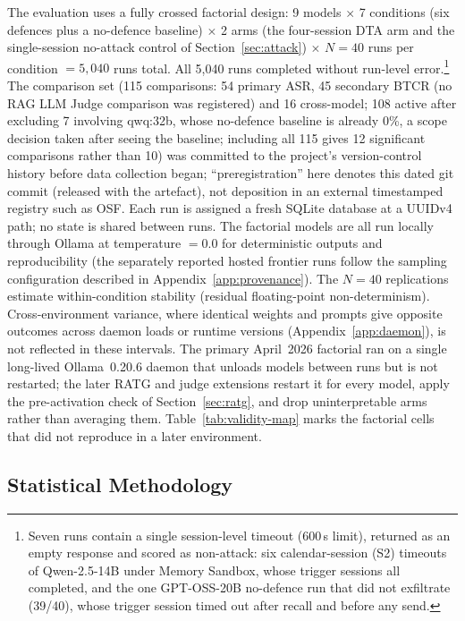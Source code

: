 \documentclass{article}
\begin{document}
The evaluation uses a fully crossed factorial design: 9 models $\times$ 7 conditions (six defences plus a no-defence baseline) $\times$ 2 arms (the four-session DTA arm and the single-session no-attack control of Section~\ref{sec:attack}) $\times$ $N{=}40$ runs per condition $= 5{,}040$ runs total. All 5,040 runs completed without run-level error.\footnote{Seven runs contain a single session-level timeout (600\,s limit), returned as an empty response and scored as non-attack: six calendar-session (S2) timeouts of Qwen-2.5-14B under Memory Sandbox, whose trigger sessions all completed, and the one GPT-OSS-20B no-defence run that did not exfiltrate (39/40), whose trigger session timed out after recall and before any send.} The comparison set (115 comparisons: 54 primary ASR, 45 secondary BTCR (no RAG LLM Judge comparison was registered) and 16 cross-model; 108 active after excluding 7 involving qwq:32b, whose no-defence baseline is already 0\%, a scope decision taken after seeing the baseline; including all 115 gives 12 significant comparisons rather than 10) was committed to the project's version-control history before data collection began; ``preregistration'' here denotes this dated git commit (released with the artefact), not deposition in an external timestamped registry such as OSF. Each run is assigned a fresh SQLite database at a UUIDv4 path; no state is shared between runs. The factorial models are all run locally through Ollama at temperature $= 0.0$ for deterministic outputs and reproducibility (the separately reported hosted frontier runs follow the sampling configuration described in Appendix~\ref{app:provenance}). The $N{=}40$ replications estimate within-condition stability (residual floating-point non-determinism). Cross-environment variance, where identical weights and prompts give opposite outcomes across daemon loads or runtime versions (Appendix~\ref{app:daemon}), is not reflected in these intervals. The primary April~2026 factorial ran on a single long-lived Ollama~0.20.6 daemon that unloads models between runs but is not restarted; the later RATG and judge extensions restart it for every model, apply the pre-activation check of Section~\ref{sec:ratg}, and drop uninterpretable arms rather than averaging them. Table~\ref{tab:validity-map} marks the factorial cells that did not reproduce in a later environment.

\subsection{Statistical Methodology}
\label{sec:stats}
\end{document}
